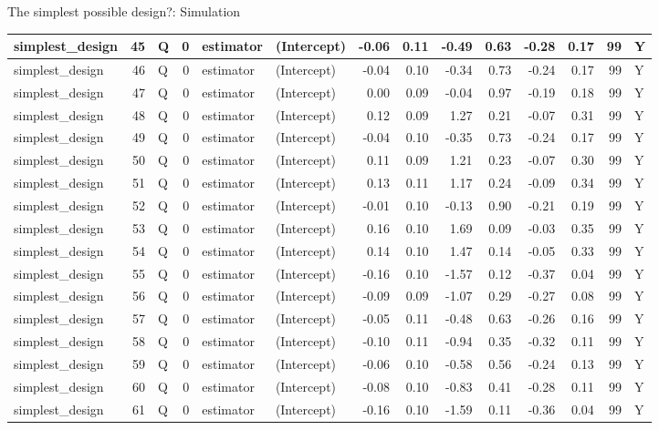 \documentclass[
  11pt,
  ignorenonframetext,
]{beamer}
\begin{document}
\begin{frame}[fragile]{The simplest possible design?: Simulation}
\begin{tabular}{l|r|l|r|l|l|r|r|r|r|r|r|r|l}
\hline
simplest\_design & 45 & Q & 0 & estimator & (Intercept) & -0.06 & 0.11 & -0.49 & 0.63 & -0.28 & 0.17 & 99 & Y\\
\hline
simplest\_design & 46 & Q & 0 & estimator & (Intercept) & -0.04 & 0.10 & -0.34 & 0.73 & -0.24 & 0.17 & 99 & Y\\
\hline
simplest\_design & 47 & Q & 0 & estimator & (Intercept) & 0.00 & 0.09 & -0.04 & 0.97 & -0.19 & 0.18 & 99 & Y\\
\hline
simplest\_design & 48 & Q & 0 & estimator & (Intercept) & 0.12 & 0.09 & 1.27 & 0.21 & -0.07 & 0.31 & 99 & Y\\
\hline
simplest\_design & 49 & Q & 0 & estimator & (Intercept) & -0.04 & 0.10 & -0.35 & 0.73 & -0.24 & 0.17 & 99 & Y\\
\hline
simplest\_design & 50 & Q & 0 & estimator & (Intercept) & 0.11 & 0.09 & 1.21 & 0.23 & -0.07 & 0.30 & 99 & Y\\
\hline
simplest\_design & 51 & Q & 0 & estimator & (Intercept) & 0.13 & 0.11 & 1.17 & 0.24 & -0.09 & 0.34 & 99 & Y\\
\hline
simplest\_design & 52 & Q & 0 & estimator & (Intercept) & -0.01 & 0.10 & -0.13 & 0.90 & -0.21 & 0.19 & 99 & Y\\
\hline
simplest\_design & 53 & Q & 0 & estimator & (Intercept) & 0.16 & 0.10 & 1.69 & 0.09 & -0.03 & 0.35 & 99 & Y\\
\hline
simplest\_design & 54 & Q & 0 & estimator & (Intercept) & 0.14 & 0.10 & 1.47 & 0.14 & -0.05 & 0.33 & 99 & Y\\
\hline
simplest\_design & 55 & Q & 0 & estimator & (Intercept) & -0.16 & 0.10 & -1.57 & 0.12 & -0.37 & 0.04 & 99 & Y\\
\hline
simplest\_design & 56 & Q & 0 & estimator & (Intercept) & -0.09 & 0.09 & -1.07 & 0.29 & -0.27 & 0.08 & 99 & Y\\
\hline
simplest\_design & 57 & Q & 0 & estimator & (Intercept) & -0.05 & 0.11 & -0.48 & 0.63 & -0.26 & 0.16 & 99 & Y\\
\hline
simplest\_design & 58 & Q & 0 & estimator & (Intercept) & -0.10 & 0.11 & -0.94 & 0.35 & -0.32 & 0.11 & 99 & Y\\
\hline
simplest\_design & 59 & Q & 0 & estimator & (Intercept) & -0.06 & 0.10 & -0.58 & 0.56 & -0.24 & 0.13 & 99 & Y\\
\hline
simplest\_design & 60 & Q & 0 & estimator & (Intercept) & -0.08 & 0.10 & -0.83 & 0.41 & -0.28 & 0.11 & 99 & Y\\
\hline
simplest\_design & 61 & Q & 0 & estimator & (Intercept) & -0.16 & 0.10 & -1.59 & 0.11 & -0.36 & 0.04 & 99 & Y\\

\end{tabular}
\end{frame}
\end{document}
